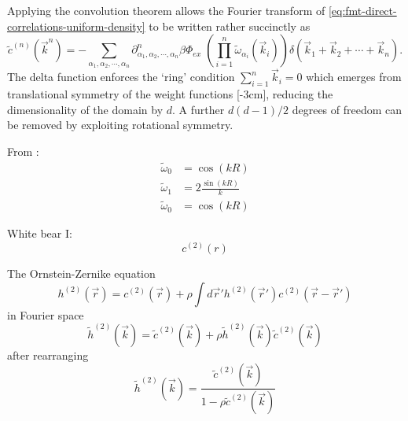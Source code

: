 \documentclass[12pt]{report}
\begin{document}
Applying the convolution theorem allows the Fourier transform of \eqref{eq:fmt-direct-correlations-uniform-density} to be written rather succinctly as
\begin{equation}
  \tilde{c}^{(n)}(\vec{k}^n) =
  - \sum_{\alpha_1, \alpha_2, \cdots, \alpha_n}
  \partial^n_{\alpha_1, \alpha_2, \cdots, \alpha_n} \beta\Phi_{ex} \;
  \left( \prod_{i=1}^n \widetilde{\omega}_{\alpha_i}(\vec{k}_i) \right)
  \delta(\vec{k}_1 + \vec{k}_2 + \cdots + \vec{k}_n).
\end{equation}
The delta function enforces the `ring' condition $\sum_{i=1}^n \vec{k}_i = 0$ which emerges from translational symmetry of the weight functions%
[-3cm],
reducing the dimensionality of the domain by $d$.
A further $d(d-1)/2$ degrees of freedom%
can be removed by exploiting rotational symmetry.

From \cite{Rosenfeld1990}:
\begin{align}
  \widetilde{\omega}_0 &= \cos{(kR)} \\
  \widetilde{\omega}_1 &= 2\frac{\sin{(kR)}}{k} \\
  \widetilde{\omega}_0 &= \cos{(kR)}
\end{align}

White bear I:
\begin{equation}
  c^{(2)}(r)
\end{equation}

The Ornstein-Zernike equation
\begin{equation}
  h^{(2)}(\vec{r}) =
  c^{(2)}(\vec{r}) +
  \rho \int d\vec{r}' h^{(2)}(\vec{r}') c^{(2)}(\vec{r} - \vec{r}')
\end{equation}
in Fourier space
\begin{equation*}
  \tilde{h}^{(2)}(\vec{k}) =
  \tilde{c}^{(2)}(\vec{k}) +
  \rho \tilde{h}^{(2)}(\vec{k}) \tilde{c}^{(2)}(\vec{k})
\end{equation*}
after rearranging
\begin{equation}
  \tilde{h}^{(2)}(\vec{k}) =
  \frac{\tilde{c}^{(2)}(\vec{k})}{1 - \rho \tilde{c}^{(2)}(\vec{k})}
\end{equation}
\end{document}
